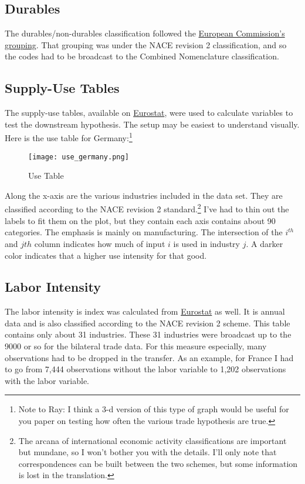 \documentclass[11pt]{article}
\begin{document}
\subsection{Durables} %
\label{sub:durables}
  The durables/non-durables classification followed the \href{http://eur-lex.europa.eu/LexUriServ/LexUriServ.do?uri=OJ:L:2007:155:0003:0006:EN:PDF}{European Commission's grouping}.  That grouping was under the NACE revision 2 classification, and so the codes had to be broadcast to the Combined Nomenclature classification.

\subsection{Supply-Use Tables}
\label{sub:supply_use_tables}

  The supply-use tables, available on \href{http://appsso.eurostat.ec.europa.eu/nui/show.do?dataset=naio_cp16_r2&lang=en}{Eurostat}, were used to calculate variables to test the downstream hypothesis.  The setup may be easiest to understand visually.  Here is the use table for Germany:\footnote{Note to Ray: I think a 3-d version of this type of graph would be useful for you paper on testing how often the various trade hypothesis are true.}

  \begin{figure}[h] \label{fig:use_germany}
    \centering
      \texttt{[image: use\_germany.png]}
    \caption{Use Table}
  \end{figure}

  Along the x-axis are the various industries included in the data set.  They are classified according to the NACE revision 2 standard.\footnote{The arcana of international economic activity classifications are important but mundane, so I won't bother you with the details.  I'll only note that correspondences can be built between the two schemes, but some information is lost in the translation.}  I've had to thin out the labels to fit them on the plot, but they contain each axis contains about 90 categories.  The emphasis is mainly on manufacturing.  The intersection of the $i^{th}$ and $j{th}$ column indicates how much of input $i$ is used in industry $j$.  A darker color indicates that a higher use intensity for that good.

\subsection{Labor Intensity}
\label{sub:labor_intensity}

  The labor intensity is index was calculated from \href{http://appsso.eurostat.ec.europa.eu/nui/show.do?dataset=sts_inlb_a&lang=en}{Eurostat} as well.  It is annual data and is also classified according to the NACE revision 2 scheme.  This table contains only about 31 industries.  These 31 industries were broadcast up to the 9000 or so for the bilateral trade data.  For this measure especially, many observations had to be dropped in the transfer. As an example, for France I had to go from 7,444 observations without the labor variable to 1,202 observations with the labor variable.





\end{document}
